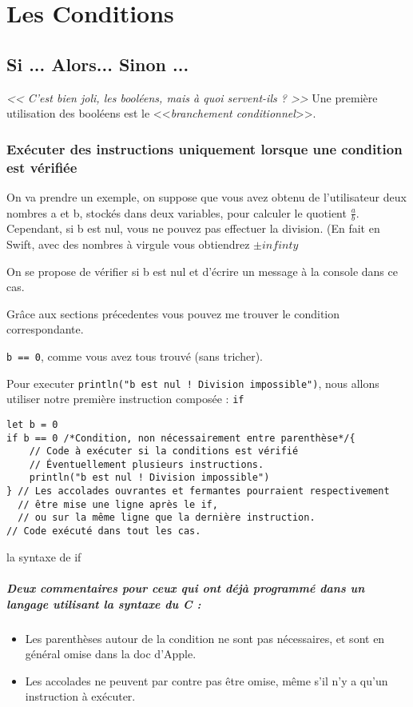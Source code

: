 \chapter{Les Conditions}
\section{Si ... Alors... Sinon ...}
\emph{<< C'est bien joli, les booléens, mais à quoi servent-ils ? >>}
Une première utilisation des booléens est le <<\emph{branchement conditionnel}>>.
\subsection{Exécuter des instructions uniquement lorsque une condition est vérifiée}
On va prendre un exemple, on suppose que vous avez obtenu de l'utilisateur deux nombres a et b, stockés dans deux variables, pour calculer le quotient $\frac{a}{b}$.
Cependant, si b est nul, vous ne pouvez pas effectuer la division. (En fait en Swift, avec des nombres à virgule vous obtiendrez $\pm infinty$

On se propose de vérifier si b est nul et d'écrire un message à la console dans ce cas.

Grâce aux sections précedentes vous pouvez me trouver le condition correspondante.

\pagebreak %
\texttt{b == 0}, comme vous avez tous trouvé (sans tricher).

Pour executer \texttt{println("b est nul ! Division impossible")}, nous allons utiliser notre première instruction composée : \texttt{if}

\begin{listing}[h]
\begin{verbatim}
let b = 0
if b == 0 /*Condition, non nécessairement entre parenthèse*/{
    // Code à exécuter si la conditions est vérifié
    // Éventuellement plusieurs instructions.
    println("b est nul ! Division impossible")
} // Les accolades ouvrantes et fermantes pourraient respectivement
  // être mise une ligne après le if,
  // ou sur la même ligne que la dernière instruction.
// Code exécuté dans tout les cas.
\end{verbatim}
\caption{la syntaxe de if}
\end{listing}
\paragraph{Deux commentaires pour ceux qui ont déjà programmé
dans un langage utilisant la syntaxe du C :}
\begin{itemize}
\item Les parenthèses autour de la condition ne sont pas nécessaires,
et sont en général omise dans la doc d'Apple.
\item Les accolades ne peuvent par contre pas être omise,
même s'il n'y a qu'un instruction à exécuter.
\end{itemize}
